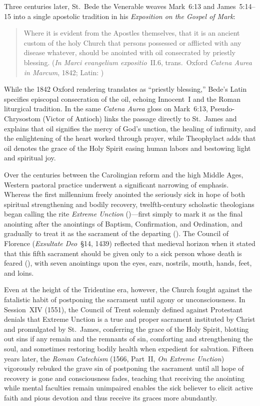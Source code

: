 Three centuries later, St.~Bede the Venerable weaves Mark~6:13 and James~5:14--15 into a single apostolic tradition in his \emph{Exposition on the Gospel of Mark}:
\begin{quotation}
Where it is evident from the Apostles themselves, that it is an ancient custom of the holy Church that persons possessed or afflicted with any disease whatever, should be anointed with oil consecrated by priestly blessing. (\emph{In Marci evangelium expositio}~II.6, trans.\ Oxford \emph{Catena Aurea in Marcum}, 1842; Latin: )
\end{quotation}
While the 1842 Oxford rendering translates  as ``priestly blessing,'' Bede's Latin specifies episcopal consecration of the oil, echoing Innocent~I and the Roman liturgical tradition. In the same \emph{Catena Aurea} gloss on Mark~6:13, Pseudo-Chrysostom (Victor of Antioch) links the passage directly to St.~James and explains that oil signifies the mercy of God's unction, the healing of infirmity, and the enlightening of the heart worked through prayer, while Theophylact adds that oil denotes the grace of the Holy Spirit easing human labors and bestowing light and spiritual joy.

Over the centuries between the Carolingian reform and the high Middle Ages, Western pastoral practice underwent a significant narrowing of emphasis. Whereas the first millennium freely anointed the seriously sick in hope of both spiritual strengthening and bodily recovery, twelfth-century scholastic theologians began calling the rite \emph{Extreme Unction} ()---first simply to mark it as the final anointing after the anointings of Baptism, Confirmation, and Ordination, and gradually to treat it as the sacrament of the departing (). The Council of Florence (\emph{Exsultate Deo}~\S14, 1439) reflected that medieval horizon when it stated that this fifth sacrament should be given only to a sick person whose death is feared (), with seven anointings upon the eyes, ears, nostrils, mouth, hands, feet, and loins.

Even at the height of the Tridentine era, however, the Church fought against the fatalistic habit of postponing the sacrament until agony or unconsciousness. In Session~XIV (1551), the Council of Trent solemnly defined against Protestant denials that Extreme Unction is a true and proper sacrament instituted by Christ and promulgated by St.~James, conferring the grace of the Holy Spirit, blotting out sins if any remain and the remnants of sin, comforting and strengthening the soul, and sometimes restoring bodily health when expedient for salvation. Fifteen years later, the \emph{Roman Catechism} (1566, Part~II, \emph{On Extreme Unction}) vigorously rebuked the grave sin of postponing the sacrament until all hope of recovery is gone and consciousness fades, teaching that receiving the anointing while mental faculties remain unimpaired enables the sick believer to elicit active faith and pious devotion and thus receive its graces more abundantly.

